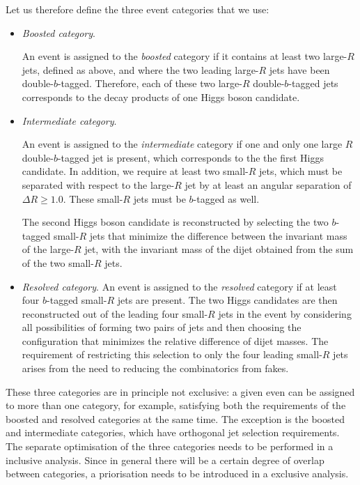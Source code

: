 Let us therefore define the three event categories that
we use:
\begin{itemize}
\item {\it Boosted category}.

  An event is assigned to the {\it boosted} category if it
  contains at least two large-$R$ jets, defined as above,
  and where  the two leading large-$R$ jets have been
   double-$b$-tagged.
 Therefore, each of these two large-$R$ double-$b$-tagged jets corresponds to the
 decay products of one Higgs boson candidate.

\item {\it Intermediate category}.

  An event is assigned to the {\it intermediate} category if
  one and only one large $R$ double-$b$-tagged jet is present,
  which corresponds to the the first Higgs candidate.
  In addition, we require at least two small-$R$ jets,
  which must be separated with respect to the large-$R$
  jet by at least an angular separation of $\Delta R\ge 1.0$.
  These small-$R$ jets must be $b$-tagged as well.

  
  The second Higgs boson candidate is reconstructed
  by selecting the two $b$-tagged small-$R$ jets that minimize the difference
  between the invariant mass of the large-$R$ jet,
  with the invariant mass of the dijet obtained
  from the sum of the two small-$R$ jets.
  
\item {\it Resolved category}.
  An event is assigned to the {\it resolved} category
  if at least
  four $b$-tagged small-$R$ jets are present.
  The two Higgs candidates are then reconstructed out of the
  leading four small-$R$ jets in the event
  by considering all possibilities of forming two pairs of jets
  and then choosing the configuration that minimizes the relative difference of
  dijet masses.
  The requirement of restricting this selection to only the four
  leading small-$R$ jets arises from the need to reducing the
  combinatorics from  fakes.
\end{itemize}
These three categories are in principle not exclusive:
a given even can be assigned to more than one category, for
example, satisfying both the requirements of the boosted and resolved
categories at the same time.
%
The exception is the boosted and intermediate categories, which have
orthogonal jet selection requirements.
%
The separate optimisation of the three categories needs to be performed in
a inclusive analysis.
%
Since in general there will be a certain degree of overlap between categories,
a priorisation needs to be introduced in a exclusive analysis.
%



